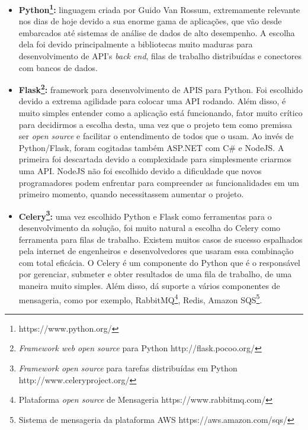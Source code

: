 \documentclass[11pt,twoside]{article}
\begin{document}
\begin{itemize}
  \item \textbf{Python\footnote{https://www.python.org/}:} linguagem criada por Guido Van Rossum, extremamente relevante nos dias de hoje devido a sua enorme gama de aplicações, que vão desde embarcados até sistemas de análise de dados de alto 
  desempenho. A escolha dela foi devido principalmente a bibliotecas muito maduras para desenvolvimento de API's \emph{back end}, filas de trabalho distribuídas e conectores com bancos de dados.

  \item \textbf{Flask\footnote{\emph{Framework web open source} para Python http://flask.pocoo.org/}:} framework para desenvolvimento de APIS para Python. Foi escolhido devido a extrema agilidade para colocar uma API rodando. Além disso, é muito simples entender como a aplicação está funcionando,
  fator muito crítico para decidirmos a escolha desta, uma vez que o projeto tem como premissa ser \emph{open source} e facilitar o entendimento de todos que o usam. Ao invés de Python/Flask, foram cogitadas também ASP.NET
  com C\# e NodeJS. A primeira foi descartada devido a complexidade para simplesmente criarmos uma API. NodeJS não foi escolhido devido a dificuldade que novos programadores podem enfrentar para compreender as
  funcionalidades em um primeiro momento, quando necessitassem aumentar o projeto.

  \item \textbf{Celery\footnote{\emph{Framework open source} para tarefas distribuídas em Python http://www.celeryproject.org/}:} uma vez escolhido Python e Flask como ferramentas para o desenvolvimento da solução, foi muito natural a escolha do Celery como ferramenta para filas de trabalho. Existem muitos
  casos de sucesso espalhados pela internet de engenheiros e desenvolvedores que usaram essa combinação com total eficácia. O Celery é um componente do Python que é o responsável por gerenciar, submeter e obter
  resultados de uma fila de trabalho, de uma maneira muito simples. Além disso, dá suporte a vários componentes de mensageria, como por exemplo, RabbitMQ\footnote{Plataforma \emph{open source} de Mensageria https://www.rabbitmq.com/}, 
  Redis, Amazon SQS\footnote{Sistema de mensageria da plataforma AWS https://aws.amazon.com/sqs/}.


\end{itemize}
\end{document}
